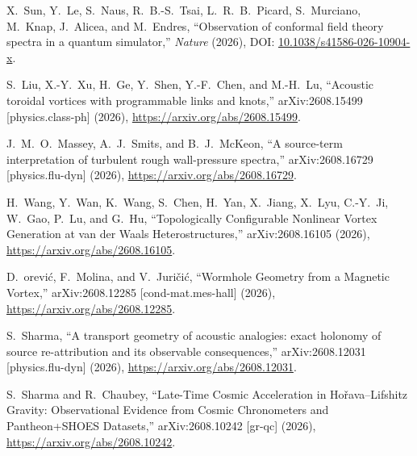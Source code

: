 
X.~Sun, Y.~Le, S.~Naus, R.~B.-S.~Tsai, L.~R.~B.~Picard,
S.~Murciano, M.~Knap, J.~Alicea, and M.~Endres,
``Observation of conformal field theory spectra in a quantum simulator,''
\emph{Nature} (2026),
DOI: \href{https://doi.org/10.1038/s41586-026-10904-x}{10.1038/s41586-026-10904-x}.

S.~Liu, X.-Y.~Xu, H.~Ge, Y.~Shen, Y.-F.~Chen, and M.-H.~Lu,
``Acoustic toroidal vortices with programmable links and knots,''
arXiv:2608.15499 [physics.class-ph] (2026),
\url{https://arxiv.org/abs/2608.15499}.

J.~M.~O.~Massey, A.~J.~Smits, and B.~J.~McKeon,
``A source-term interpretation of turbulent rough wall-pressure spectra,''
arXiv:2608.16729 [physics.flu-dyn] (2026),
\url{https://arxiv.org/abs/2608.16729}.

H.~Wang, Y.~Wan, K.~Wang, S.~Chen, H.~Yan, X.~Jiang, X.~Lyu,
C.-Y.~Ji, W.~Gao, P.~Lu, and G.~Hu,
``Topologically Configurable Nonlinear Vortex Generation at van der Waals Heterostructures,''
arXiv:2608.16105 (2026),
\url{https://arxiv.org/abs/2608.16105}.

D.~{\DJ}or{\dj}evi\'c, F.~Molina, and V.~Juri\v{c}i\'c,
``Wormhole Geometry from a Magnetic Vortex,''
arXiv:2608.12285 [cond-mat.mes-hall] (2026),
\url{https://arxiv.org/abs/2608.12285}.

S.~Sharma,
``A transport geometry of acoustic analogies: exact holonomy of source re-attribution and its observable consequences,''
arXiv:2608.12031 [physics.flu-dyn] (2026),
\url{https://arxiv.org/abs/2608.12031}.

S.~Sharma and R.~Chaubey,
``Late-Time Cosmic Acceleration in Ho\v{r}ava--Lifshitz Gravity:
Observational Evidence from Cosmic Chronometers and Pantheon+SHOES Datasets,''
arXiv:2608.10242 [gr-qc] (2026),
\url{https://arxiv.org/abs/2608.10242}.
